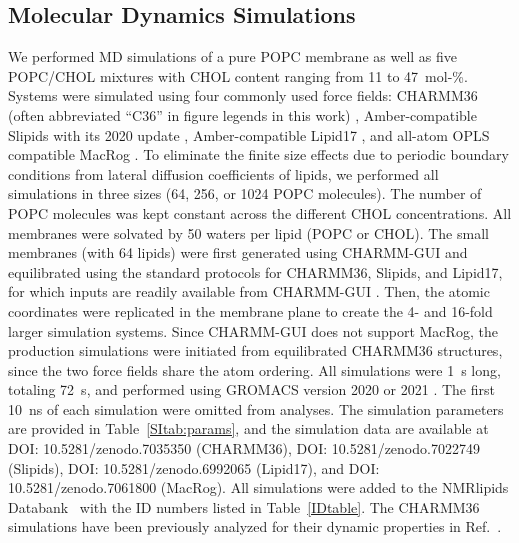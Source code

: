 \documentclass[journal=jctcce]{achemso}
\begin{document}
\subsection{Molecular Dynamics Simulations}

We performed MD simulations of a pure POPC membrane as well as five POPC/CHOL mixtures with CHOL content ranging from 11 to 47~mol-\%. Systems were simulated using four commonly used force fields: CHARMM36 (often abbreviated ``C36'' in figure legends in this work) \cite{Klauda06,lim12}, Amber-compatible Slipids \cite{jambeck12,jambeck12b,jambeck13b} with its 2020 update \cite{grote2020optimization}, Amber-compatible Lipid17 \cite{dickson14,madej15}, and all-atom OPLS compatible MacRog \cite{kulig14,kulig15,Kulig16}. To eliminate the finite size effects due to periodic boundary conditions from lateral diffusion coefficients of lipids, we performed all simulations in three sizes (64, 256, or 1024 POPC molecules). The number of POPC molecules was kept constant across the different CHOL concentrations. All membranes were solvated by 50 waters per lipid (POPC or CHOL). The small membranes (with 64 lipids) were first generated using CHARMM-GUI and equilibrated using the standard protocols for CHARMM36, Slipids, and Lipid17, for which inputs are readily available from CHARMM-GUI \cite{lee16,lee2020charmm}. Then, the atomic coordinates were replicated in the membrane plane to create the 4- and 16-fold larger simulation systems. Since CHARMM-GUI does not support MacRog, the production simulations were initiated from equilibrated CHARMM36 structures, since the two force fields share the atom ordering. All simulations were 1~\textmu{}s long, totaling 72~\textmu{}s, and performed using GROMACS version 2020 or 2021 \cite{pall2020heterogeneous}. The first 10~ns of each simulation were omitted from analyses. The simulation parameters are provided in Table~\ref{SItab:params}, and the simulation data are available at DOI: 10.5281/zenodo.7035350 (CHARMM36), DOI: 10.5281/zenodo.7022749  (Slipids), DOI: 10.5281/zenodo.6992065 (Lipid17), and DOI: 10.5281/zenodo.7061800 (MacRog). All simulations were added to the NMRlipids Databank~\cite{NMRlipidsDatabank} with the ID numbers listed in Table~\ref{IDtable}. The CHARMM36 simulations have been previously analyzed for their dynamic properties in Ref.~.
\end{document}
